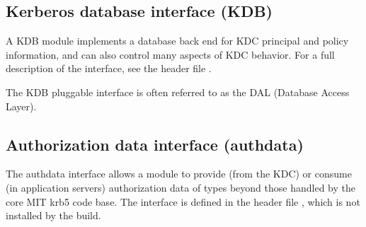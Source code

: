 \documentclass[letterpaper,10pt,english]{sphinxmanual}
\begin{document}
\subsection{Kerberos database interface (KDB)}
\label{plugindev/internal:kerberos-database-interface-kdb}
A KDB module implements a database back end for KDC principal and
policy information, and can also control many aspects of KDC behavior.
For a full description of the interface, see the header file
.

The KDB pluggable interface is often referred to as the DAL (Database
Access Layer).


\subsection{Authorization data interface (authdata)}
\label{plugindev/internal:authorization-data-interface-authdata}
The authdata interface allows a module to provide (from the KDC) or
consume (in application servers) authorization data of types beyond
those handled by the core MIT krb5 code base.  The interface is
defined in the header file , which is not
installed by the build.



\renewcommand{\indexname}{Index}
\printindex
\end{document}
